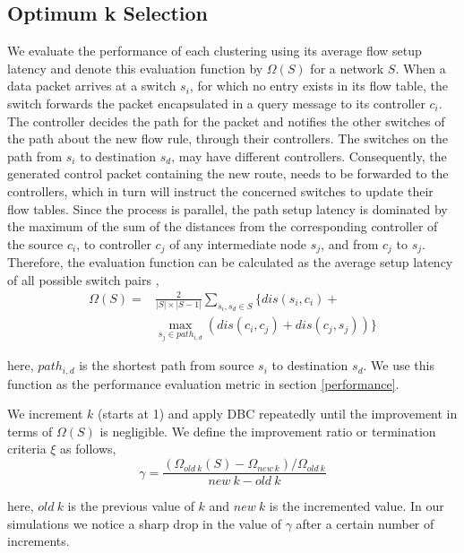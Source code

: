 \documentclass{IEEEtran}
\begin{document}
	\subsection{Optimum k Selection} \label{optimumK}
	We evaluate the performance of each clustering using its average flow setup latency and denote this evaluation function by $\Omega(S)$ for a network $S$. When a data packet arrives at a switch $s_i$, for which no entry exists in its flow table, the switch forwards the packet encapsulated in a query message to its controller $c_i$. The controller decides the path for the packet and notifies the other switches of the path about the new flow rule, through their controllers. The switches on the path from $s_i$ to destination $s_d$, may have different controllers. Consequently, the generated control packet containing the new route, needs to be forwarded to the controllers, which in turn will instruct the concerned switches to update their flow tables. Since the process is parallel, the path setup latency is dominated by the maximum of the sum of the distances from the corresponding controller of the source $c_i$, to controller $c_j$ of any intermediate node $s_j$, and from $c_j$ to $s_j$. Therefore, the evaluation function can be calculated as the average setup latency of all possible switch pairs \cite{dbcp2017},
	\begin{equation} \label{eqn:setupLatency}
	\begin{split}
	\Omega(S) = &\frac{2}{|S|\times |S-1|}\sum_{s_i,s_d\in S} \{dis(s_i,c_i)+\\ &\max_{s_j\in path_{i,d}}\left(dis(c_i,c_j)+dis(c_j,s_j) \right) \}
	\end{split}
	\end{equation}
	
	here, $path_{i,d}$ is the shortest path from source $s_i$ to destination $s_d$. We use this function as the performance evaluation metric in section \ref{performance}.
	
	We increment $k$ (starts at 1) and apply DBC repeatedly until the improvement in terms of $\Omega(S)$ is negligible. We define the improvement ratio or termination criteria $\xi$ as follows,
	\begin{equation} \label{eqn:optimalK}
	\gamma = \frac{(\Omega_{old~k}(S)-\Omega_{new~k})/\Omega_{old~k}}{new~k-old~k}
	\end{equation}
	
	here, $old~k$ is the previous value of $k$ and $new~k$ is the incremented value. In our simulations we notice a sharp drop in the value of $\gamma$ after a certain number of increments.
	
\end{document}
